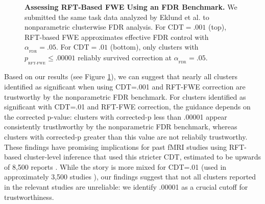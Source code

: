 \documentclass[9pt,twocolumn,twoside]{pnas-new}
\newcommand{\subtext}[2]{
#1_{_{\text{#2}}}
}
\begin{document}
\begin{figure}[ht]
\centering
\caption{
\textbf{Assessing RFT-Based FWE Using an FDR Benchmark.}
We submitted the same task data analyzed by Eklund et al. \cite{eklund_cluster_2016,tom_neural_2007,poldrack_toward_2013} to nonparametric clusterwise FDR analysis. For $\text{CDT}=.001$ (top), RFT-based FWE approximates effective FDR control with $\subtext{\alpha}{FDR} = .05$. For $\text{CDT}=.01$ (bottom), only clusters with $\subtext{p}{RFT-FWE} \leq .00001$ reliably survived correction at $\subtext{\alpha}{FDR}=.05$. 
\label{fig:p-plot}
}
\end{figure}

Based on our results (see Figure \ref{fig:p-plot}), we can suggest that nearly all clusters identified as significant when using CDT=.001 and RFT-FWE correction are trustworthy by the nonparametric FDR benchmark.
For clusters identified as significant with CDT=.01 and RFT-FWE correction, the guidance depends on the corrected p-value: clusters with corrected-p less than .00001 appear consistently trusthworthy by the nonparametric FDR benchmark, whereas clusters with corrected-p greater than this value are not reliabily trustworthy.
These findings have promising implications for past fMRI studies using RFT-based cluster-level inference that used this stricter CDT, estimated to be upwards of 8,500 reports \cite{nichols_bibliometrics_2016,woo_cluster-extent_2014}.
While the story is more mixed for CDT=.01 (used in approximately 3,500 studies \cite{nichols_bibliometrics_2016,woo_cluster-extent_2014}), our findings suggest that not all clusters reported in the relevant studies are unreliable: we identify .00001 as a crucial cutoff for trustworthiness.
\end{document}

